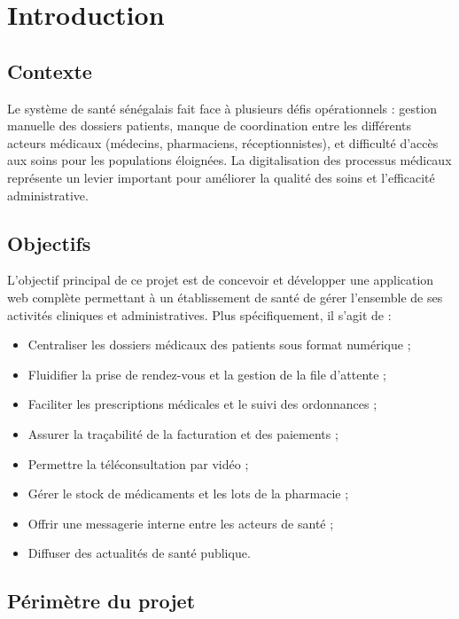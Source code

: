 \documentclass[12pt, a4paper]{report}
\begin{document}
\chapter{Introduction}

\section{Contexte}

Le système de santé sénégalais fait face à plusieurs défis opérationnels :
gestion manuelle des dossiers patients, manque de coordination entre les
différents acteurs médicaux (médecins, pharmaciens, réceptionnistes), et
difficulté d'accès aux soins pour les populations éloignées. La digitalisation
des processus médicaux représente un levier important pour améliorer la qualité
des soins et l'efficacité administrative.

\section{Objectifs}

L'objectif principal de ce projet est de concevoir et développer une application
web complète permettant à un établissement de santé de gérer l'ensemble de ses
activités cliniques et administratives. Plus spécifiquement, il s'agit de :

\begin{itemize}[leftmargin=2cm]
  \item Centraliser les dossiers médicaux des patients sous format numérique ;
  \item Fluidifier la prise de rendez-vous et la gestion de la file d'attente ;
  \item Faciliter les prescriptions médicales et le suivi des ordonnances ;
  \item Assurer la traçabilité de la facturation et des paiements ;
  \item Permettre la téléconsultation par vidéo ;
  \item Gérer le stock de médicaments et les lots de la pharmacie ;
  \item Offrir une messagerie interne entre les acteurs de santé ;
  \item Diffuser des actualités de santé publique.
\end{itemize}

\section{Périmètre du projet}
\end{document}
